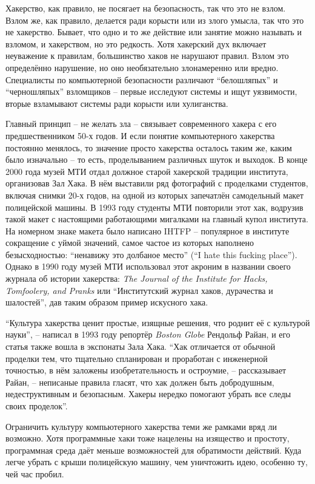 Хакерство, как правило, не посягает на безопасность, так что это не взлом. Взлом же, как правило, делается ради корысти или из злого умысла, так что это не хакерство. Бывает, что одно и то же действие или занятие можно называть и взломом, и хакерством, но это редкость. Хотя хакерский дух включает неуважение к правилам, большинство хаков не нарушают правил. Взлом это определённо нарушение, но оно необязательно злонамеренно или вредно. Специалисты по компьютерной безопасности различают \enquote{белошляпых} и \enquote{черношляпых} взломщиков -- первые исследуют системы и ищут уязвимости, вторые взламывают системы ради корысти или хулиганства.

Главный принцип -- не желать зла -- связывает современного хакера с его предшественником 50-х годов. И если понятие компьютерного хакерства постоянно менялось, то значение просто хакерства осталось таким же, каким было изначально -- то есть, проделыванием различных шуток и выходок. В конце 2000 года музей МТИ отдал должное старой хакерской традиции института, организовав Зал Хака. В нём выставили ряд фотографий с проделками студентов, включая снимки 20-х годов, на одной из которых запечатлён самодельный макет полицейской машины. В 1993 году студенты МТИ повторили этот хак, водрузив такой макет с настоящими работающими мигалками на главный купол института. На номерном знаке макета было написано IHTFP -- популярное в институте сокращение с уймой значений, самое частое из которых наполнено безысходностью: \enquote{ненавижу это долбаное место} (\enquote{I hate this fucking place}). Однако в 1990 году музей МТИ использовал этот акроним в названии своего журнала об истории хакерства: \textit{The Journal of the Institute for Hacks, Tomfoolery, and Pranks} или \enquote{Институтский журнал хаков, дурачества и шалостей}, дав таким образом пример искусного хака.

\enquote{Культура хакерства ценит простые, изящные решения, что роднит её с культурой науки}, -- написал в 1993 году репортёр \textit{Boston Globe} Рендольф Райан, и его статья также вошла в экспонаты Зала Хака. \enquote{Хак отличается от обычной проделки тем, что тщательно спланирован и проработан с инженерной точностью, в нём заложены изобретательность и остроумие, -- рассказывает Райан, -- неписаные правила гласят, что хак должен быть добродушным, недеструктивным и безопасным. Хакеры нередко помогают убрать все следы своих проделок}.

Ограничить культуру компьютерного хакерства теми же рамками вряд ли возможно. Хотя программные хаки тоже нацелены на изящество и простоту, программная среда даёт меньше возможностей для обратимости действий. Куда легче убрать с крыши полицейскую машину, чем уничтожить идею, особенно ту, чей час пробил.

